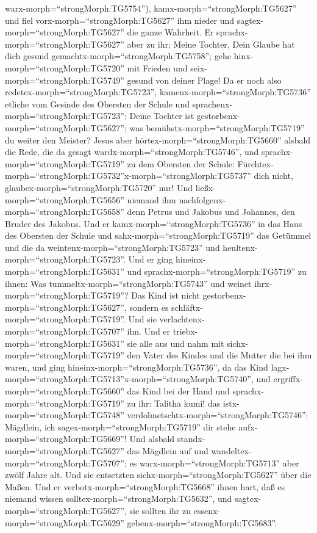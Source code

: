 warx-morph=``strongMorph:TG5754''), kamx-morph=``strongMorph:TG5627''
und fiel vorx-morph=``strongMorph:TG5627'' ihm nieder und
sagtex-morph=``strongMorph:TG5627'' die ganze Wahrheit.  Er
sprachx-morph=``strongMorph:TG5627'' aber zu ihr; Meine Tochter, Dein
Glaube hat dich gesund gemachtx-morph=``strongMorph:TG5758''; gehe
hinx-morph=``strongMorph:TG5720'' mit Frieden und
seix-morph=``strongMorph:TG5749'' gesund von deiner Plage! 
Da er noch also redetex-morph=``strongMorph:TG5723'',
kamenx-morph=``strongMorph:TG5736'' etliche vom Gesinde des Obersten der
Schule und sprachenx-morph=``strongMorph:TG5723'': Deine Tochter ist
gestorbenx-morph=``strongMorph:TG5627''; was
bemühstx-morph=``strongMorph:TG5719'' du weiter den Meister?
 Jesus aber hörtex-morph=``strongMorph:TG5660'' alsbald die
Rede, die da gesagt wardx-morph=``strongMorph:TG5746'', und
sprachx-morph=``strongMorph:TG5719'' zu dem Obersten der Schule:
Fürchtex-morph=``strongMorph:TG5732''\textbar x-morph=``strongMorph:TG5737''
dich nicht, glaubex-morph=``strongMorph:TG5720'' nur!  Und
ließx-morph=``strongMorph:TG5656'' niemand ihm
nachfolgenx-morph=``strongMorph:TG5658'' denn Petrus und Jakobus und
Johannes, den Bruder des Jakobus.  Und er
kamx-morph=``strongMorph:TG5736'' in das Haus des Obersten der Schule
und sahx-morph=``strongMorph:TG5719'' das Getümmel und die da
weintenx-morph=``strongMorph:TG5723'' und
heultenx-morph=``strongMorph:TG5723''.  Und er ging
hineinx-morph=``strongMorph:TG5631'' und
sprachx-morph=``strongMorph:TG5719'' zu ihnen: Was
tummeltx-morph=``strongMorph:TG5743'' und weinet
ihrx-morph=``strongMorph:TG5719''? Das Kind ist nicht
gestorbenx-morph=``strongMorph:TG5627'', sondern es
schläftx-morph=``strongMorph:TG5719''. Und sie
verlachtenx-morph=``strongMorph:TG5707'' ihn.  Und er
triebx-morph=``strongMorph:TG5631'' sie alle aus und nahm mit
sichx-morph=``strongMorph:TG5719'' den Vater des Kindes und die Mutter
die bei ihm waren, und ging hineinx-morph=``strongMorph:TG5736'', da das
Kind lagx-morph=``strongMorph:TG5713''x-morph=``strongMorph:TG5740'',
 und ergriffx-morph=``strongMorph:TG5660'' das Kind bei der
Hand und sprachx-morph=``strongMorph:TG5719'' zu ihr: Talitha kumi! das
istx-morph=``strongMorph:TG5748''
verdolmetschtx-morph=``strongMorph:TG5746'': Mägdlein, ich
sagex-morph=``strongMorph:TG5719'' dir stehe
aufx-morph=``strongMorph:TG5669''!  Und alsbald
standx-morph=``strongMorph:TG5627'' das Mägdlein auf und
wandeltex-morph=``strongMorph:TG5707''; es
warx-morph=``strongMorph:TG5713'' aber zwölf Jahre alt. Und sie
entsetzten sichx-morph=``strongMorph:TG5627'' über die Maßen.
 Und er verbotx-morph=``strongMorph:TG5668'' ihnen hart,
daß es niemand wissen solltex-morph=``strongMorph:TG5632'', und
sagtex-morph=``strongMorph:TG5627'', sie sollten ihr zu
essenx-morph=``strongMorph:TG5629'' gebenx-morph=``strongMorph:TG5683''.

